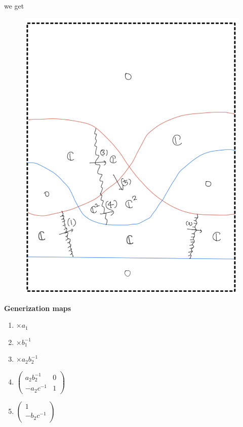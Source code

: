 \begin{enumerate}[label = (\roman*)]
\begin{enumerate}[label = (Step \arabic*)]
we get
\begin{figure}[H]
    \centering
    \includegraphics[scale = 0.95]{diagrams/cobord_gen/base_6.png}
    \caption{}
    \label{fig:your-label}
\end{figure}
\textbf{Generization maps}
\begin{enumerate}[label = (\arabic*)]
\item $\times a_1$

\item $\times b_1^{-1}$

\item $\times a_2b_2^{-1}$

\item 
$\begin{pmatrix}
a_2b_2^{-1} & 0 \\
-a_2c^{-1} & 1
\end{pmatrix}$

\item 
$\begin{pmatrix}
1 \\
-b_2c^{-1} 
\end{pmatrix}$
\end{enumerate}



\end{enumerate}
\end{enumerate}
